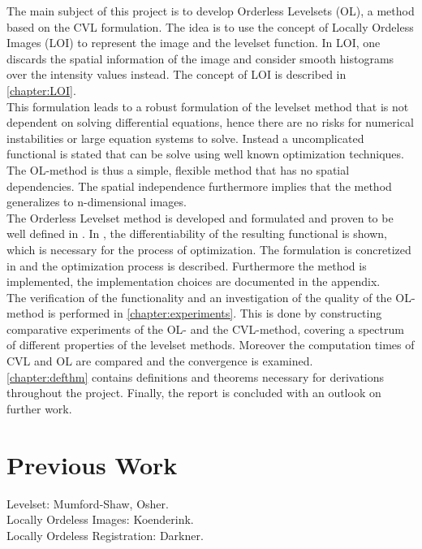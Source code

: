 The main subject of this project is to develop Orderless Levelsets (OL), a method based on the CVL formulation. The idea is to use the concept of Locally Ordeless Images (LOI) to represent the image and the levelset function. In LOI, one discards the spatial information of the image and consider smooth histograms over the intensity values instead. The concept of LOI is described in \cref{chapter:LOI}.\\
This formulation leads to a robust formulation of the levelset method that is not dependent on solving differential equations, hence there are no risks for numerical instabilities or large equation systems to solve. Instead a uncomplicated functional is stated that can be solve using well known optimization techniques. The OL-method is thus a simple, flexible method that has no spatial dependencies. The spatial independence furthermore implies that the method generalizes to n-dimensional images.\\
The Orderless Levelset method is developed and formulated and proven to be well defined in . In , the differentiability of the resulting functional is shown, which is necessary for the process of optimization. The formulation is concretized in  and the optimization process is described. Furthermore the method is implemented, the implementation choices are documented in the appendix.\\

The verification of the functionality and an investigation of the quality of the OL-method is performed in \cref{chapter:experiments}. This is done by constructing comparative experiments of the OL- and the CVL-method, covering a spectrum of different properties of the levelset methods. Moreover the computation times of CVL and OL are compared and the convergence is examined.\\
\cref{chapter:defthm} contains definitions and theorems necessary for derivations throughout the project. Finally, the report is concluded with an outlook on further work.

\section{Previous Work}
Levelset: Mumford-Shaw, Osher.\\
Locally Ordeless Images: Koenderink.\\
Locally Ordeless Registration: Darkner.